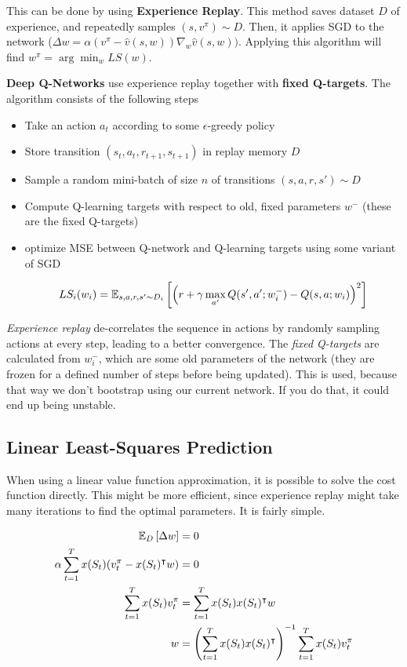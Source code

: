 This can be done by using \textbf{Experience Replay}. This method saves dataset $D$ of experience, and repeatedly samples $(s, v^\pi) \sim D$. Then, it applies SGD to the network ($\Delta w = \alpha (v^\pi - \hat{v}(s, w)) \nabla_w \hat{v}(s, w))$. Applying this algorithm will find $w^\pi = \arg\min_w LS(w)$.

\textbf{Deep Q-Networks} use experience replay together with \textbf{fixed Q-targets}. The algorithm consists of the following steps

\begin{itemize}
	\item Take an action $a_t$ according to some $\epsilon$-greedy policy
	\item Store transition $(s_t, a_t, r_{t+1}, s_{t+1})$ in replay memory $D$
	\item Sample a random mini-batch of size $n$ of transitions $(s, a, r, s') \sim D$
	\item Compute Q-learning targets with respect to old, fixed parameters $w^-$ (these are the fixed Q-targets)
	\item optimize MSE between Q-network and Q-learning targets using some variant of SGD
	
	\begin{equation*}
		LS_i(w_i) = \operatorname{\mathbb{E}}_{s, a, r, s' \sim D_i} \left[\left(r + \gamma \max_{a'} Q(s', a'; w_i^-) - Q(s, a; w_i)\right)^2\right]
	\end{equation*}
\end{itemize}

\textit{Experience replay} de-correlates the sequence in actions by randomly sampling actions at every step, leading to a better convergence. The \textit{fixed Q-targets} are calculated from $w_i^-$, which are some old parameters of the network (they are frozen for a defined number of steps before being updated). This is used, because that way we don't bootstrap using our current network. If you do that, it could end up being unstable.

\subsection{Linear Least-Squares Prediction}

When using a linear value function approximation, it is possible to solve the cost function directly. This might be more efficient, since experience replay might take many iterations to find the optimal parameters. It is fairly simple.

\begin{equation*}
	\begin{aligned}
		\operatorname{\mathbb{E}}_D \left[\Delta w\right] & = 0\\
		\alpha \sum_{t = 1}^T x(S_t)(v_t^\pi - x(S_t)^\intercal w) & = 0\\
		\sum_{t = 1}^T x(S_t)v_t^\pi & = \sum_{t = 1}^T x(S_t)x(S_t)^\intercal w\\
		w & = \left(\sum_{t = 1}^T x(S_t)x(S_t)^\intercal\right)^{-1} \sum_{t = 1}^T x(S_t)v_t^\pi
	\end{aligned}
\end{equation*}

